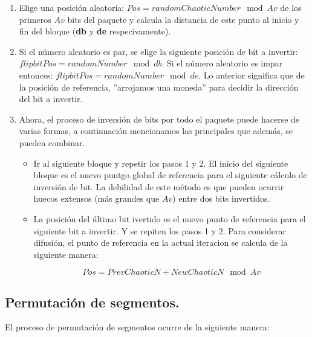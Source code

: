 \documentclass[10pt]{IEEEtran}
\begin{document}
\begin{enumerate}
\item Elige una posición aleatoria: $Pos= randomChaoticNumber \mod{Av}$ de los primeros $Av$ bits del paquete y calcula la distancia de este punto al inicio y fin del bloque (\textbf{db} y \textbf{de} respecivamente).


\item Si el número aleatorio es par, se elige la siguiente posición de bit a invertir: $flipbitPos = randomNumber \mod{db} $. Si el número aleatorio es impar entonces: $flipbitPos = randomNumber \mod{de}$. Lo anterior significa que de la posición de referencia, ''arrojamos una moneda'' para decidir la dirección del bit a invertir.


\item Ahora, el proceso de inversión de bits por todo el paquete puede hacerse de varias formas, a continuación mencionamos las principales que además, se pueden combinar.

\begin{itemize}
\item Ir al siguiente bloque y repetir los pasos 1 y 2. El inicio del siguiente bloque es el nuevo puntgo global de referencia para el siguiente cálculo de inversión de bit. La debilidad de este método es que pueden ocurrir huecos extensos (más grandes que $Av$) entre dos bits invertidos. 


\item La posición del último bit ivertido es el nuevo punto de referencia para el siguiente bit a invertir. Y se repiten los pasos 1 y 2. Para considerar difusión, el punto de referencia en la actual iteracion se calcula de la siguiente manera:


\begin{equation}
Pos = PrevChaoticN+
NewChaoticN \mod{Av}
\end{equation}


\end{itemize}



\end{enumerate}



\subsection{Permutación de segmentos.}

El proceso de permutación de segmentos ocurre de la siguiente manera:
\end{document}
